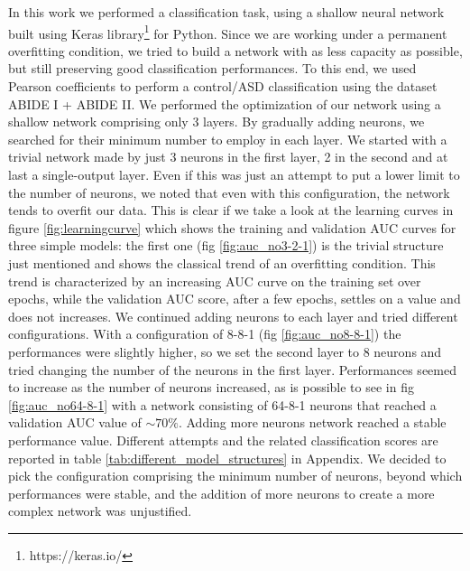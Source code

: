 \documentclass[11pt]{report}
\begin{document}
In this work we performed a classification task, using a shallow neural network built using Keras library\footnote{https://keras.io/} for Python.
Since we are working under a permanent overfitting condition, we tried to build a network with as less capacity as possible, but still preserving good classification performances.
To this end, we used Pearson coefficients to perform a control/ASD classification using the dataset ABIDE I + ABIDE II.
We performed the optimization of our network using a shallow network comprising only 3 layers.
By gradually adding neurons, we searched for their minimum number to employ in each layer.
We started with a trivial network made by just 3 neurons in the first layer, 2 in the second and at last a single-output layer.
Even if this was just an attempt to put a lower limit to the number of neurons, we noted that even with this configuration, the network tends to overfit our data.
This is clear if we take a look at the learning curves in figure \ref{fig:learningcurve} which shows the training and validation AUC curves for three simple models: the first one (fig \ref{fig:auc_no3-2-1}) is the trivial structure just mentioned and shows the classical trend of an overfitting condition.
This trend is characterized by an increasing AUC curve on the training set over epochs, while the validation AUC score, after a few epochs, settles on a value and does not increases. 
We continued adding neurons to each layer and tried different configurations. 
With a configuration of 8-8-1 (fig \ref{fig:auc_no8-8-1}) the performances were slightly higher, so we set the second layer to 8 neurons and tried changing the number of the neurons in the first layer.
Performances seemed to increase as the number of neurons increased, as is possible to see in fig \ref{fig:auc_no64-8-1} with a network consisting of 64-8-1 neurons that reached a validation AUC value of $\sim 70\%$. 
Adding more neurons network reached a stable performance value.
Different attempts and the related classification scores are reported in table \ref{tab:different_model_structures} in Appendix.
We decided to pick the configuration comprising the minimum number of neurons, beyond which performances were stable, and the addition of more neurons to create a more complex network was unjustified.
\end{document}
